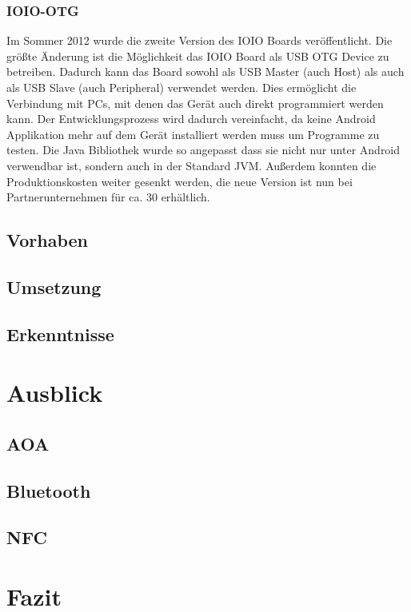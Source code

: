 \documentclass[12pt,journal,compsoc]{IEEEtran}
\begin{document}
\subsubsection{IOIO-OTG}
Im Sommer 2012 wurde die zweite Version des IOIO Boards veröffentlicht.
Die größte Änderung ist die Möglichkeit das IOIO Board als USB OTG Device zu betreiben.
Dadurch kann das Board sowohl als USB Master (auch Host) als auch als USB Slave (auch Peripheral) verwendet werden.
Dies ermöglicht die Verbindung mit PCs, mit denen das Gerät auch direkt programmiert werden kann.
Der Entwicklungsprozess wird dadurch vereinfacht, da keine Android Applikation mehr auf dem Gerät installiert werden muss um Programme zu testen.
Die Java Bibliothek wurde so angepasst dass sie nicht nur unter Android verwendbar ist, sondern auch in der Standard JVM.
Außerdem konnten die Produktionskosten weiter gesenkt werden, die neue Version ist nun bei Partnerunternehmen für ca. 30\textdollar{} erhältlich.

\subsection{Vorhaben}

\subsection{Umsetzung}

\subsection{Erkenntnisse}





\section{Ausblick}
\subsection{AOA}

\subsection{Bluetooth}

\subsection{NFC}
\section{Fazit}









\nocite{*}
\end{document}
